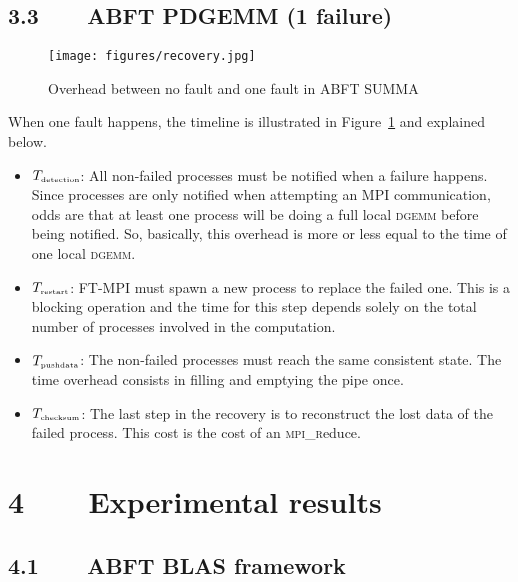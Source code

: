 \documentclass[pdftex,11pt]{article}
\begin{document}
\subsection*{\color{DodgerBlue4}3.3~~~~ABFT PDGEMM (1 failure)}

\begin{figure}
\color{DodgerBlue4}
\begin{center}
\texttt{[image: figures/recovery.jpg]}
\end{center}
\caption{\label{fig:recovery}
\color{black}
Overhead between no fault and one fault in ABFT SUMMA
}
\end{figure}

When one fault happens, the timeline is illustrated in
Figure~\ref{fig:recovery} and explained below.

\begin{itemize}

\item $T_{\textmd{\tiny{detection}}}$: All non-failed processes must
  be notified when a failure happens.  Since processes are only
  notified when attempting an MPI communication, odds are that at
  least one process will be doing a full local \textsc{dgemm} before
  being notified. So, basically, this overhead is more or less equal
  to the time of one local \textsc{dgemm}.

\item $T_{\textmd{\tiny{restart}}}$: FT-MPI must spawn a new process
  to replace the failed one. This is a blocking operation and the time
  for this step depends solely on the total number of processes
  involved in the computation.

\item $T_{\textmd{\tiny{pushdata}}}$: The non-failed processes must
  reach the same consistent state. The time overhead consists in
  filling and emptying the pipe once.

\item $T_{\textmd{\tiny{checksum}}}$: The last step in the recovery is
  to reconstruct the lost data of the failed process. This cost is the
  cost of an \textsc{mpi\_r}educe.

\end{itemize}

\section*{\color{DodgerBlue4}4~~~~Experimental results}

\subsection*{\color{DodgerBlue4} 4.1~~~~ABFT BLAS framework}
\end{document}
